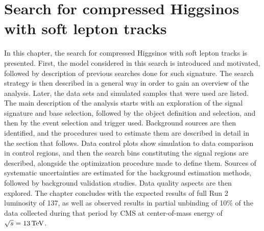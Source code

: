 \chapter{Search for compressed Higgsinos with soft lepton tracks}

In this chapter, the search for compressed Higgsinos with soft lepton tracks is presented.
First, the model considered in this search is introduced and motivated, followed by description of previous searches done for such signature. The search strategy is then described in a general way in order to gain an overview of the analysis. Later, the data sets and simulated samples that were used are listed. The main description of the analysis starts with an exploration of the signal signature and base selection, followed by the object definition and selection, and then by the event selection and trigger used. Background sources are then identified, and the procedures used to estimate them are described in detail in the section that follows. Data control plots show simulation to data comparison in control regions, and then the search bins constituting the signal regions are described, alongside the optimization procedure made to define them. Sources of systematic uncertainties are estimated
for the background estimation methods, followed by background validation studies. Data quality aspects are then explored. The chapter concludes with the expected results of full Run 2 luminosity of 137\fbinv, as well as observed results in partial unbinding of 10\% of the data collected during that period by CMS at center-of-mass energy of $\sqrt{s}=13\,\text{Te\hspace{-.08em}V}$.





























